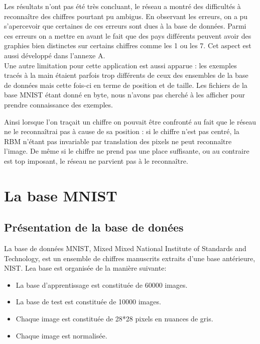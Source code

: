 \documentclass[a4paper,oneside]{report}
\begin{document}
Les résultats n'ont pas été très concluant, le réseau a montré des difficultés à reconnaître des chiffres pourtant pu ambigus. En observant les erreurs, on a pu s'apercevoir que certaines de ces erreurs sont dues à la base de données. Parmi ces erreurs on a mettre en avant le fait que des pays différents peuvent avoir des graphies bien distinctes sur certains chiffres comme les 1 ou les 7. Cet aspect est aussi développé dans l'annexe A.\\

Une autre limitation pour cette application est aussi apparue : les exemples tracés à la main étaient parfois trop différents de ceux des ensembles de la base de données mais cette fois-ci en terme de position et de taille. Les fichiers de la base MNIST étant donné en byte, nous n'avons pas cherché à les afficher pour prendre connaissance des exemples. 

Ainsi lorsque l'on traçait un chiffre on pouvait être confronté au fait que le réseau ne le reconnaîtrai pas à cause de sa position : si le chiffre n'est pas centré, la RBM n'étant pas invariable par translation des pixels ne peut reconnaître l'image. De même si le chiffre ne prend pas une place suffisante, ou au contraire est top imposant, le réseau ne parvient pas à le reconnaître.

    \appendix

    \chapter{La base MNIST}

            \section{Présentation de la base de donées}

                La base de données MNIST, Mixed Mixed National Institute of Standards and Technology, 
est un ensemble de chiffres manuscrits extraits d'une base antérieure, NIST. Lea base 
est organisée de la manière 
suivante:

                \begin{itemize}
                    \item La base d'apprentissage est constituée de 60000 images.
                    \item La base de test est constituée de 10000 images.
                    \item Chaque image est constituée de 28*28 pixels en nuances de gris.
                    \item Chaque image est normalisée.\\
                \end{itemize}
\end{document}
